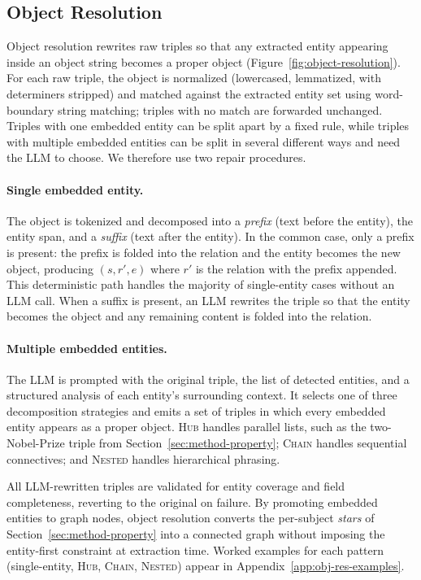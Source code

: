 \documentclass[11pt]{article}
\begin{document}
\subsection{Object Resolution}
\label{sec:method-resolution}
Object resolution rewrites raw triples so that any extracted entity appearing inside an object string becomes a proper object (Figure~\ref{fig:object-resolution}). For each raw triple, the object is normalized (lowercased, lemmatized, with determiners stripped) and matched against the extracted entity set using word-boundary string matching; triples with no match are forwarded unchanged. Triples with one embedded entity can be split apart by a fixed rule, while triples with multiple embedded entities can be split in several different ways and need the LLM to choose. We therefore use two repair procedures.
\paragraph{Single embedded entity.} The object is tokenized and decomposed into a \emph{prefix} (text before the entity), the entity span, and a \emph{suffix} (text after the entity). In the common case, only a prefix is present: the prefix is folded into the relation and the entity becomes the new object, producing $(s, r', e)$ where $r'$ is the relation with the prefix appended. This deterministic path handles the majority of single-entity cases without an LLM call. When a suffix is present, an LLM rewrites the triple so that the entity becomes the object and any remaining content is folded into the relation.
\paragraph{Multiple embedded entities.} The LLM is prompted with the original triple, the list of detected entities, and a structured analysis of each entity's surrounding context. It selects one of three decomposition strategies and emits a set of triples in which every embedded entity appears as a proper object. \textsc{Hub} handles parallel lists, such as the two-Nobel-Prize triple from Section~\ref{sec:method-property}; \textsc{Chain} handles sequential connectives; and \textsc{Nested} handles hierarchical phrasing.

All LLM-rewritten triples are validated for entity coverage and field completeness, reverting to the original on failure. By promoting embedded entities to graph nodes, object resolution converts the per-subject \emph{stars} of Section~\ref{sec:method-property} into a connected graph without imposing the entity-first constraint at extraction time. Worked examples for each pattern (single-entity, \textsc{Hub}, \textsc{Chain}, \textsc{Nested}) appear in Appendix~\ref{app:obj-res-examples}.
\end{document}
